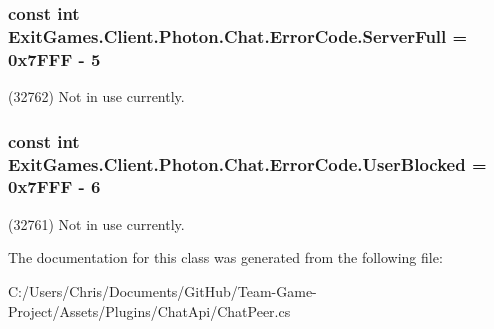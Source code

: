 \subsubsection[{\texorpdfstring{Server\+Full}{ServerFull}}]{\setlength{\rightskip}{0pt plus 5cm}const int Exit\+Games.\+Client.\+Photon.\+Chat.\+Error\+Code.\+Server\+Full = 0x7\+F\+F\+F -\/ 5}\hypertarget{class_exit_games_1_1_client_1_1_photon_1_1_chat_1_1_error_code_a2c770f32de9265fe53d881768167d7b4}{}\label{class_exit_games_1_1_client_1_1_photon_1_1_chat_1_1_error_code_a2c770f32de9265fe53d881768167d7b4}


(32762) Not in use currently.

\subsubsection[{\texorpdfstring{User\+Blocked}{UserBlocked}}]{\setlength{\rightskip}{0pt plus 5cm}const int Exit\+Games.\+Client.\+Photon.\+Chat.\+Error\+Code.\+User\+Blocked = 0x7\+F\+F\+F -\/ 6}\hypertarget{class_exit_games_1_1_client_1_1_photon_1_1_chat_1_1_error_code_a989671a923b1616f8831545f9e5baf01}{}\label{class_exit_games_1_1_client_1_1_photon_1_1_chat_1_1_error_code_a989671a923b1616f8831545f9e5baf01}


(32761) Not in use currently.



The documentation for this class was generated from the following file\+:\begin{DoxyCompactItemize}
\item 
C\+:/\+Users/\+Chris/\+Documents/\+Git\+Hub/\+Team-\/\+Game-\/\+Project/\+Assets/\+Plugins/\+Chat\+Api/Chat\+Peer.\+cs\end{DoxyCompactItemize}
